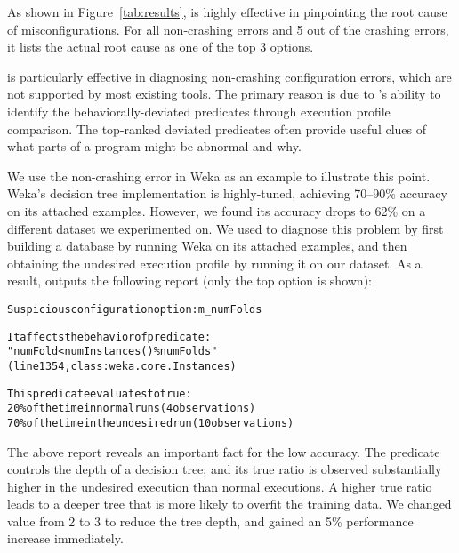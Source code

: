 

As shown in Figure~\ref{tab:results},
\ourtool is highly effective in pinpointing the root cause of
misconfigurations. For all \noncrash non-crashing errors
and 5 out of the \crash crashing errors, it lists the actual root cause as one of the top 3 options. 


\ourtool is particularly effective in diagnosing non-crashing configuration errors,
which are not supported by most existing tools. The primary reason is due to
\ourtool's ability to identify the behaviorally-deviated predicates through
execution profile comparison. The top-ranked deviated predicates often provide
useful clues of what parts of a program might be abnormal and why.

We use the non-crashing error in Weka as an example to illustrate
this point. 
Weka's decision tree implementation is highly-tuned, achieving 70--90\% accuracy on
its attached examples. However, we found its accuracy drops to 62\%
on a different dataset we experimented on. We used \ourtool to diagnose this
problem by first building a database by running Weka on its attached examples, and
then
obtaining the undesired execution profile by running it on our dataset. As a result,
\ourtool outputs the following report (only the top option is shown):


\begin{CodeOut}
\begin{alltt} 
Suspicious configuration option: m\_numFolds

It affects the behavior of predicate:
"numFold < numInstances() \% numFolds"
(line 1354, class: weka.core.Instances) 

This predicate evaluates to true:
  20\% of the time in normal runs (4 observations)
  70\% of the time in the undesired run (10 observations)

\end{alltt}
\end{CodeOut}

\vspace{-3mm}

The above report reveals an important fact for the low accuracy.
The predicate  controls
the depth of a decision tree; and its
true ratio is observed substantially higher in the undesired execution
than normal executions. A higher true ratio leads
to a deeper tree that is more likely to overfit the training
data. We changed 
value from 2 to 3 to reduce the tree depth, and
gained an 5\% performance increase immediately.

